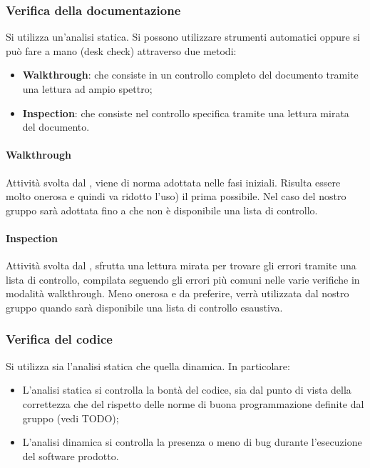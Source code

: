 \subsubsection{Verifica della documentazione}
Si utilizza un'analisi statica. Si possono utilizzare strumenti automatici oppure si può fare a mano (desk check) attraverso due metodi:
\begin{itemize}
\item \textbf{Walkthrough}: che consiste in un controllo completo del documento tramite una lettura ad ampio spettro;
\item \textbf{Inspection}: che consiste nel controllo specifica tramite una lettura mirata del documento.
\end{itemize}

\paragraph{Walkthrough}
Attività svolta dal \VE, viene di norma adottata nelle fasi iniziali. Risulta essere molto onerosa e quindi va ridotto l'uso) il prima possibile. Nel caso del nostro gruppo sarà adottata fino a che non è disponibile una lista di controllo.

\paragraph{Inspection}
Attività svolta dal \VE, sfrutta una lettura mirata per trovare gli errori tramite una lista di controllo, compilata seguendo gli errori più comuni nelle varie verifiche in modalità walkthrough. Meno onerosa e da preferire, verrà utilizzata dal nostro gruppo quando sarà disponibile una lista di controllo esaustiva.


\subsubsection{Verifica del codice}
Si utilizza sia l'analisi statica che quella dinamica. In particolare:
\begin{itemize}
\item L'analisi statica si controlla la bontà del codice, sia dal punto di vista della correttezza che del rispetto delle norme di buona programmazione definite dal gruppo (vedi TODO);
\item L'analisi dinamica si controlla la presenza o meno di bug durante l'esecuzione del software prodotto.
\end{itemize}

